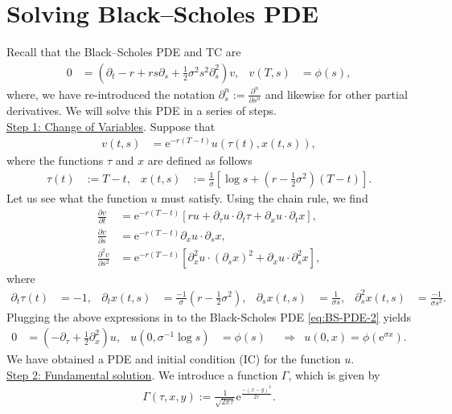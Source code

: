 \documentclass[12pt]{book}
\numberwithin{equation}{chapter}
\theoremstyle{plain}
\numberwithin{theorem}{section}
\theoremstyle{definition}
\numberwithin{exercise}{chapter}
\newcommand{\<}{\langle}
\renewcommand{\>}{\rangle}
\renewcommand{\(}{\left(}
\renewcommand{\)}{\right)}
\renewcommand{\[}{\left[}
\renewcommand{\]}{\right]}
\newcommand\sig{\sigma}
\renewcommand\d{\partial}
\newcommand\ee{\mathrm{e}}
\theoremstyle{definition}
\numberwithin{question}{section}
\begin{document}
\section{Solving Black--Scholes PDE}
Recall that the Black--Scholes PDE and TC are
\begin{align}
0
	&=	\(\d_t - r + r s \d_s + \frac{1}{2} \sigma^2 s^2 \d_s^2 \) v , &
v(T,s) 
	&= \phi(s) , \label{eq:BS-PDE-2}
\end{align}
where, we have re-introduced the notation $\d_s^n := \frac{\d^n}{\d s^n}$ and likewise for other partial derivatives.
We will solve this PDE in a series of steps.
\\[0.5em]
\underline{Step 1: Change of Variables}.
Suppose that
\begin{align}
v(t,s) &= \ee^{-r(T-t)} u(\tau(t), x(t,s)) , \label{eq:u.def}
\end{align}
where the functions $\tau$ and $x$ are defined as follows
\begin{align}
\tau(t) 
	&:= T-t , &
x(t,s) 
	&:= \frac{1}{\sig} \[ \log s + \( r - \frac{1}{2} \sigma^2 \)(T-t) \] .
\end{align}
Let us see what the function $u$ must satisfy.  Using the chain rule, we find
\begin{align}
\frac{\d v}{\d t} 
	&= \ee^{-r(T-t)}\[r u + \d_\tau u \cdot \d_t \tau + \d_x u \cdot \d_t x\] , \\
\frac{\d v}{\d s} 
	&= \ee^{-r(T-t)}\d_x u \cdot \d_s x , \\
\frac{\d^2 v}{\d s^2} 
	&=	\ee^{-r(T-t)} \[ \d^2_x u \cdot (\d_s x)^2 + \d_x u \cdot \d_s^2 x \] ,
\end{align}
where
\begin{align}
\d_t \tau(t)
	&=	-1 , &
\d_t x(t,s)
	&=	\frac{-1}{\sig} \( r - \frac{1}{2} \sigma^2 \) , &
\d_s x(t,s)
	&=	\frac{1}{\sig s} , &
\d_s^2 x(t,s)
	&=	\frac{- 1}{\sig s^2} .
\end{align}
Plugging the above expressions in to the Black-Scholes PDE \eqref{eq:BS-PDE-2} yields
\begin{align}
0	
	&=	(-\d_\tau + \frac{1}{2} \d_x^2) u , &
u(0,\sig^{-1} \log s)
	&=	\phi(s) &
	&\Rightarrow&
u(0,x) = \phi(\ee^{\sig x}) . \label{eq:u.pde}
\end{align}
We have obtained a PDE and initial condition (IC) for the function $u$.
\\[0.5em]
\underline{Step 2: Fundamental solution}.
We introduce a function $\Gamma$, which is given by
\begin{align}
	\Gamma(\tau,x,y) := \frac{1}{\sqrt{2 \pi \tau}} \ee^{\frac{-(x-y)^2}{2\tau}}.
\end{align}
\end{document}
